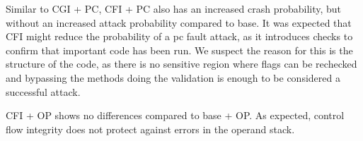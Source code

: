 Similar to CGI + PC, CFI + PC also has an increased crash probability, but without an increased attack probability compared to base. 
It was expected that CFI might reduce the probability of a pc fault attack, as it introduces checks to confirm that important code has been run. 
We suspect the reason for this is the structure of the code, as there is no sensitive region where flags can be rechecked and bypassing the methods doing the validation is enough to be considered a successful attack.

CFI + OP shows no differences compared to base + OP. As expected, control flow integrity does not protect against errors in the operand stack. 